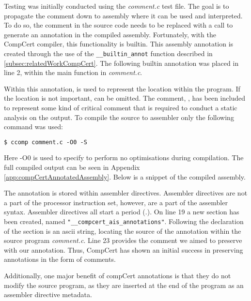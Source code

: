 Testing was initially conducted using the \textit{comment.c} test file. The goal is to propagate the comment down to assembly where it can be used and interpreted. To do so, the comment in the source code needs to be replaced with a call to generate an annotation in the compiled assembly. Fortunately, with the CompCert compiler, this functionality is builtin. This assembly annotation is created through the use of the \texttt{\_\_builtin\_annot} function described in \ref{subsec:relatedWorkCompCert}. The following builtin annotation was placed in line 2, within the main function in \textit{comment.c}.



Within this annotation,  is used to represent the location within the program. If the location is not important,  can be omitted. The comment, , has been included to represent some kind of critical comment that is required to conduct a static analysis on the output. To compile the source to assembler only the following command was used:

\begin{lstlisting}[numbers=none]
$ ccomp comment.c -O0 -S
\end{lstlisting}

Here -O0 is used to specify to perform no optimisations during compilation. The full compiled output can be seen in Appendix \ref{app:compCertAnnotatedAssembly}. Below is a snippet of the compiled assembly.



The annotation is stored within assembler directives. Assembler directives are not a part of the processor instruction set, however, are a part of the assembler syntax. Assembler directives all start a period (.). On line 19 a new section has been created, named \texttt{"\_\_compcert\_ais\_annotations"}. Following the declaration of the section is an ascii string, locating the source of the annotation within the source program \textit{comment.c}. Line 23 provides the comment we aimed to preserve with our annotation. Thus, CompCert has shown an initial success in preserving annotations in the form of comments.

Additionally, one major benefit of compCert annotations is that they do not modify the source program, as they are inserted at the end of the program as an assembler directive metadata.

